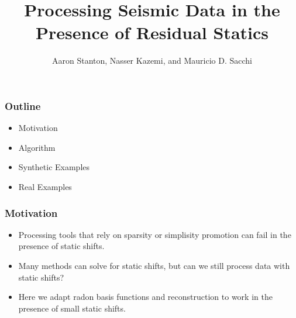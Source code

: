 \title[Short title]{Processing Seismic Data in the Presence of Residual Statics}
\author{Aaron Stanton, Nasser Kazemi, and Mauricio D. Sacchi}
\date{}

\maketitle


\begin{frame} \frametitle{Outline}
    \begin{itemize}
        \item Motivation
        \item Algorithm
        \item Synthetic Examples
        \item Real Examples
    \end{itemize}
\end{frame}

\begin{frame} \frametitle{Motivation}
    \begin{itemize}
        \item Processing tools that rely on sparsity or simplisity promotion can fail in the presence of static shifts.
	\item Many methods can solve for static shifts, but can we still process data with static shifts? 
	\item Here we adapt radon basis functions and reconstruction to work in the presence of small static shifts.
    \end{itemize}
\end{frame}



